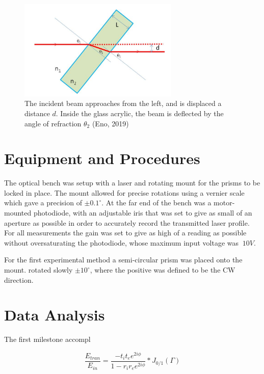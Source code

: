 \documentclass[colorlinks=true,pdfstartview=FitV,linkcolor=blue,
            citecolor=red,urlcolor=magenta]{basedoc}
\begin{document}
      \begin{figure}[!h]
        \begin{center}
        \includegraphics[width=3in]{resources/snells_law.png}
        \caption{The incident beam approaches from the left, and is displaced a distance $d$. Inside the glass acrylic, the beam is deflected by the angle of refraction $\theta_2$ (Eno, 2019)}
        \label{fig:snellslaw}
        \end{center}
      \end{figure}

\section{Equipment and Procedures}

  The optical bench was setup with a laser and rotating mount for the prisms to be locked in place. The mount allowed for precise rotations using a vernier scale which gave a precision of $\pm0.1^{\circ}$. At the far end of the bench was a motor-mounted photodiode, with an adjustable iris that was set to give as small of an aperture as possible in order to accurately record the transmitted laser profile. For all measurements the gain was set to give as high of a reading as possible without oversaturating the photodiode, whose maximum input voltage was $~10V$.
  
  For the first experimental method a semi-circular prism was placed onto the mount. rotated slowly $\pm 10^{\circ}$, where the positive was defined to be the CW direction.



\section{Data Analysis}

  The first milestone accompl

    \begin{equation} \label{eq:etran}
     \frac {E_{tran}} {E_{in}} = \frac {-t_i t_e e^{2i\phi}} {1 - r_i r_e e^{2i\phi}} * J_{0/1}(\Gamma)
    \end{equation}
\end{document}
